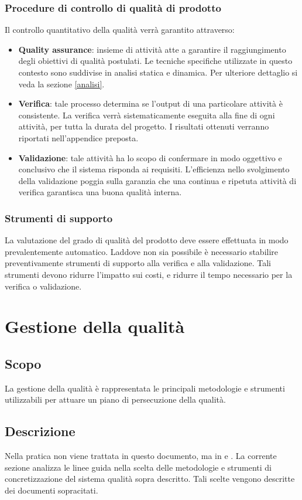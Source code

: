 \documentclass[12pt,a4paper]{article}
\begin{document}
\subsubsection{Procedure di controllo di qualità di prodotto}
\label{sec:procedure-di-controllo-di-qualità-di-prodotto}
Il controllo quantitativo della qualità verrà garantito attraverso:
\begin{itemize}
	\item{\textbf{Quality assurance}}: insieme di attività atte a garantire il raggiungimento degli obiettivi di qualità postulati. 
	Le tecniche specifiche utilizzate in questo contesto sono suddivise in analisi statica e dinamica. Per ulteriore dettaglio si veda la sezione \ref{analisi}.
	\item{\textbf{Verifica}}: tale processo determina se l'output di una particolare attività è consistente. La verifica verrà sistematicamente eseguita alla fine di ogni attività, per tutta la durata del progetto. I risultati ottenuti verranno riportati nell'appendice preposta.
	\item{\textbf{Validazione}}: tale attività ha lo scopo di confermare in modo oggettivo e conclusivo che il sistema risponda ai requisiti. L'efficienza nello svolgimento della validazione poggia sulla garanzia che una continua e ripetuta attività di verifica garantisca una buona qualità interna.
\end{itemize}
\subsubsection{Strumenti di supporto}
La valutazione del grado di qualità del prodotto deve essere effettuata in modo prevalentemente automatico. Laddove non sia possibile è necessario stabilire preventivamente strumenti di supporto alla verifica e alla validazione. Tali strumenti devono ridurre l'impatto sui costi, e ridurre il tempo necessario per la verifica o validazione. 


\section{Gestione della qualità}
\label{gest_qual}
\subsection{Scopo}
La gestione della qualità è rappresentata le principali metodologie e strumenti utilizzabili per attuare un piano di persecuzione della qualità. 

\subsection{Descrizione}
Nella pratica non viene trattata in questo documento, ma in \PdP{} e \NdP{}.
La corrente sezione analizza le linee guida nella scelta delle metodologie e strumenti di concretizzazione del sistema qualità sopra descritto. Tali scelte vengono descritte dei documenti sopracitati.
\end{document}
